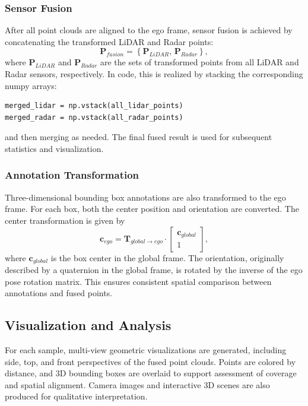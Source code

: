 \documentclass[10pt, a4paper, oneside]{article}
\begin{document}
\subsubsection{Sensor Fusion}
After all point clouds are aligned to the ego frame, sensor fusion is achieved by concatenating the transformed LiDAR and Radar points:
\begin{equation}
\mathbf{P}_{fusion} = \left\{ \mathbf{P}_{LiDAR},\, \mathbf{P}_{Radar} \right\},
\end{equation}
where $\mathbf{P}_{LiDAR}$ and $\mathbf{P}_{Radar}$ are the sets of transformed points from all LiDAR and Radar sensors, respectively. In code, this is realized by stacking the corresponding numpy arrays:
\begin{verbatim}
merged_lidar = np.vstack(all_lidar_points)
merged_radar = np.vstack(all_radar_points)
\end{verbatim}
and then merging as needed. The final fused result is used for subsequent statistics and visualization.

\subsubsection{Annotation Transformation}
Three-dimensional bounding box annotations are also transformed to the ego frame. For each box, both the center position and orientation are converted. The center transformation is given by
\begin{equation}
\mathbf{c}_{ego} = \mathbf{T}_{global \rightarrow ego} \cdot 
\begin{bmatrix} \mathbf{c}_{global} \\ 1 \end{bmatrix},
\end{equation}
where $\mathbf{c}_{global}$ is the box center in the global frame. The orientation, originally described by a quaternion in the global frame, is rotated by the inverse of the ego pose rotation matrix. This ensures consistent spatial comparison between annotations and fused points.
\subsection{Visualization and Analysis}
For each sample, multi-view geometric visualizations are generated, including side, top, and front perspectives of the fused point clouds. Points are colored by distance, and 3D bounding boxes are overlaid to support assessment of coverage and spatial alignment. Camera images and interactive 3D scenes are also produced for qualitative interpretation.
\end{document}
